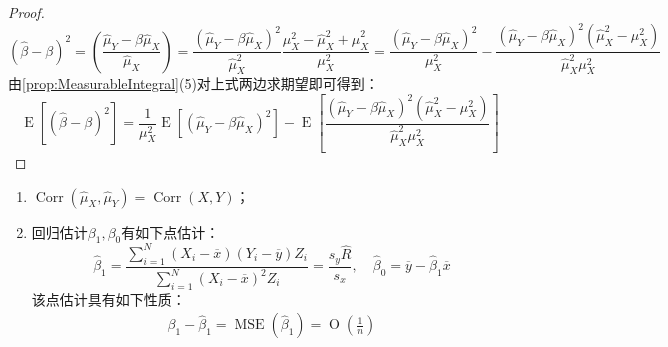 \begin{proof}
	\begin{equation*}
		(\hat{\beta}-\beta)^2=\left(\frac{\hat{\mu}_Y-\beta\hat{\mu}_X}{\hat{\mu}_X}\right)=\frac{(\hat{\mu}_Y-\beta\hat{\mu}_X)^2}{\hat{\mu}_X^2}\frac{\mu_X^2-\hat{\mu}_X^2+\hat{\mu}_X^2}{\mu_X^2}=\frac{(\hat{\mu}_Y-\beta\hat{\mu}_X)^2}{\mu_X^2}-\frac{(\hat{\mu}_Y-\beta\hat{\mu}_X)^2(\hat{\mu}_X^2-\mu_X^2)}{\hat{\mu}_X^2\mu_X^2}
	\end{equation*}
	由\cref{prop:MeasurableIntegral}(5)对上式两边求期望即可得到：
	\begin{equation*}
		\operatorname{E}[(\hat{\beta}-\beta)^2]=\frac{1}{\mu_X^2}\operatorname{E}\left[(\hat{\mu}_Y-\beta\hat{\mu}_X)^2\right]-\operatorname{E}\left[\frac{(\hat{\mu}_Y-\beta\hat{\mu}_X)^2(\hat{\mu}_X^2-\mu_X^2)}{\hat{\mu}_X^2\mu_X^2}\right]
	\end{equation*}
\end{proof}
\begin{property}
	\begin{enumerate}
		\item $\operatorname{Corr}(\hat{\mu}_X,\hat{\mu}_Y)=\operatorname{Corr}(X,Y)$；
		\item 回归估计$\beta_1,\beta_0$有如下点估计：
		\begin{equation*}
			\hat{\beta}_1=\frac{\sum\limits_{i=1}^{N}(X_i-\overline{x})(Y_i-\overline{y})Z_i}{\sum\limits_{i=1}^{N}(X_i-\overline{x})^2Z_i}=\frac{s_y\hat{R}}{s_x},\quad
			\hat{\beta}_0=\overline{y}-\hat{\beta}_1\overline{x}
		\end{equation*}
		该点估计具有如下性质：
		\begin{gather*}
			\beta_1-\hat{\beta}_1=\operatorname{MSE}(\hat{\beta}_1)=\operatorname{O}\left(\frac{1}{n}\right)
		\end{gather*}
	\end{enumerate}
\end{property}
